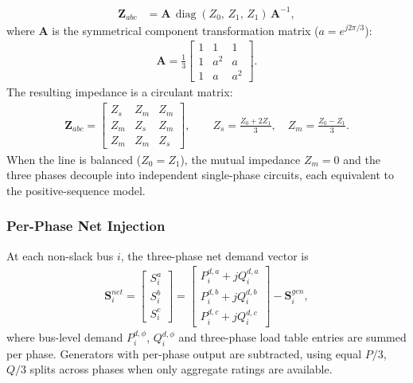 \begin{align}
  \mathbf{Z}_{abc} &= \mathbf{A}\,
    \operatorname{diag}(Z_0,\, Z_1,\, Z_1)\,
    \mathbf{A}^{-1},
\end{align}
where $\mathbf{A}$ is the symmetrical component transformation matrix
($a = e^{j2\pi/3}$):
\begin{align}
  \mathbf{A} = \frac{1}{3}
  \begin{bmatrix}
    1 & 1 & 1 \\
    1 & a^2 & a \\
    1 & a & a^2
  \end{bmatrix}.
\end{align}
The resulting impedance is a circulant matrix:
\begin{align}
  \mathbf{Z}_{abc} =
  \begin{bmatrix}
    Z_s & Z_m & Z_m \\
    Z_m & Z_s & Z_m \\
    Z_m & Z_m & Z_s
  \end{bmatrix},
  \qquad
  Z_s = \frac{Z_0 + 2Z_1}{3}, \quad
  Z_m = \frac{Z_0 - Z_1}{3}.
\end{align}
When the line is balanced ($Z_0 = Z_1$), the mutual impedance $Z_m = 0$ and the
three phases decouple into independent single-phase circuits, each equivalent to
the positive-sequence model.

\subsubsection{Per-Phase Net Injection}

At each non-slack bus $i$, the three-phase net demand vector is
\begin{align}
  \mathbf{S}_i^{net} =
  \begin{bmatrix} S_i^a \\ S_i^b \\ S_i^c \end{bmatrix}
  =
  \begin{bmatrix}
    P_i^{d,a} + jQ_i^{d,a} \\
    P_i^{d,b} + jQ_i^{d,b} \\
    P_i^{d,c} + jQ_i^{d,c}
  \end{bmatrix}
  - \mathbf{S}_i^{gen},
\end{align}
where bus-level demand $P_i^{d,\phi}$, $Q_i^{d,\phi}$ and three-phase load
table entries are summed per phase.  Generators with per-phase output are
subtracted, using equal $P/3$, $Q/3$ splits across phases when only aggregate
ratings are available.


